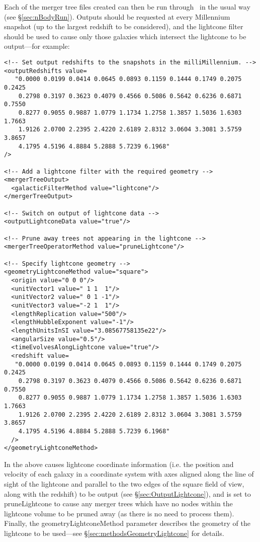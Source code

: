 Each of the merger tree files created can then be run through \glc\ in the usual way (see \S\ref{sec:nBodyRun}).  Outputs should be requested at every Millennium snapshot (up to the largest redshift to be considered), and the {\normalfont \ttfamily lightcone} filter should be used to cause only those galaxies which intersect the lightcone to be output---for example:
\begin{verbatim}
<!-- Set output redshifts to the snapshots in the milliMillennium. -->
<outputRedshifts value=
   "0.0000 0.0199 0.0414 0.0645 0.0893 0.1159 0.1444 0.1749 0.2075 0.2425
    0.2798 0.3197 0.3623 0.4079 0.4566 0.5086 0.5642 0.6236 0.6871 0.7550
    0.8277 0.9055 0.9887 1.0779 1.1734 1.2758 1.3857 1.5036 1.6303 1.7663
    1.9126 2.0700 2.2395 2.4220 2.6189 2.8312 3.0604 3.3081 3.5759 3.8657
    4.1795 4.5196 4.8884 5.2888 5.7239 6.1968"
/>

<!-- Add a lightcone filter with the required geometry -->
<mergerTreeOutput>
  <galacticFilterMethod value="lightcone"/>
</mergerTreeOutput>

<!-- Switch on output of lightcone data -->
<outputLightconeData value="true"/>

<!-- Prune away trees not appearing in the lightcone -->
<mergerTreeOperatorMethod value="pruneLightcone"/>

<!-- Specify lightcone geometry -->
<geometryLightconeMethod value="square">
  <origin value="0 0 0"/>
  <unitVector1 value=" 1 1  1"/>
  <unitVector2 value=" 0 1 -1"/>
  <unitVector3 value="-2 1  1"/>
  <lengthReplication value="500"/>
  <lengthHubbleExponent value="-1"/>
  <lengthUnitsInSI value="3.08567758135e22"/>
  <angularSize value="0.5"/>
  <timeEvolvesAlongLightcone value="true"/>
  <redshift value=
   "0.0000 0.0199 0.0414 0.0645 0.0893 0.1159 0.1444 0.1749 0.2075 0.2425
    0.2798 0.3197 0.3623 0.4079 0.4566 0.5086 0.5642 0.6236 0.6871 0.7550
    0.8277 0.9055 0.9887 1.0779 1.1734 1.2758 1.3857 1.5036 1.6303 1.7663
    1.9126 2.0700 2.2395 2.4220 2.6189 2.8312 3.0604 3.3081 3.5759 3.8657
    4.1795 4.5196 4.8884 5.2888 5.7239 6.1968"
  />
</geometryLightconeMethod>
\end{verbatim}
In the above {\normalfont \ttfamily [outputLightconeData]} causes lightcone coordinate information (i.e. the position and velocity of each galaxy in a coordinate system with axes aligned along the line of sight of the lightcone and parallel to the two edges of the square field of view, along with the redshift) to be output (see \S\ref{sec:OutputLightcone}), and {\normalfont \ttfamily [mergerTreeOperatorMethod]} is set to {\normalfont \ttfamily pruneLightcone} to cause any merger trees which have no nodes within the lightcone volume to be pruned away (as there is no need to process them). Finally, the {\normalfont \ttfamily geometryLightconeMethod} parameter describes the geometry of the lightcone to be used---see \S\ref{sec:methodsGeometryLightcone} for details.

